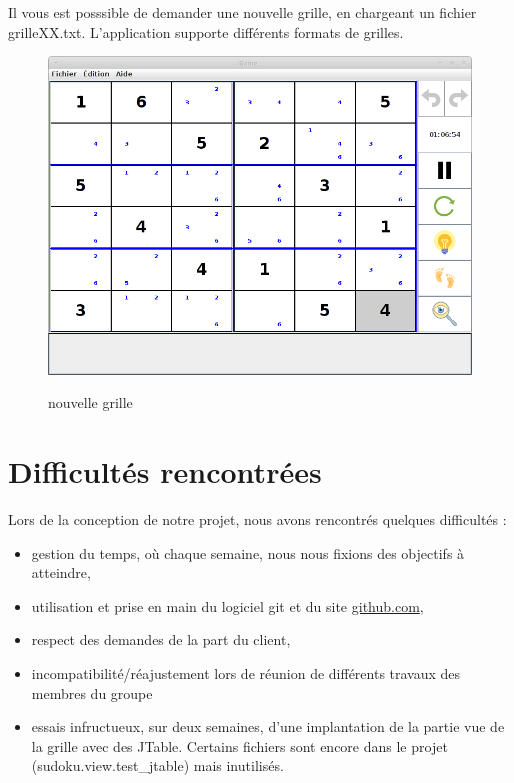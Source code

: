 \newpage
Il vous est posssible de demander une nouvelle grille, en chargeant 
un fichier grilleXX.txt. L'application supporte différents formats de grilles. 
\begin{figure}[ht]
  \caption{\label{annexe15} nouvelle grille}
  \includegraphics [width=130mm]{images/newGrid.png} \\[0.5cm]
\end{figure}

\newpage
\section{Difficultés rencontrées}
Lors de la conception de notre projet, nous avons rencontrés quelques difficultés :
\begin{itemize}
 \item gestion du temps, où chaque semaine, nous nous fixions des objectifs à atteindre,
 \item utilisation et prise en main du logiciel git et du site 
	    \href{https://github.com/yuki1996/Sudoku}{github.com}, 
 \item respect des demandes de la part du client, 
 \item incompatibilité/réajustement lors de réunion de différents travaux des membres du groupe
 \item essais infructueux, sur deux semaines, d'une implantation de la partie vue
    de la grille avec des JTable. Certains fichiers sont encore dans le projet (sudoku.view.test\_jtable)
    mais inutilisés.
\end{itemize}
